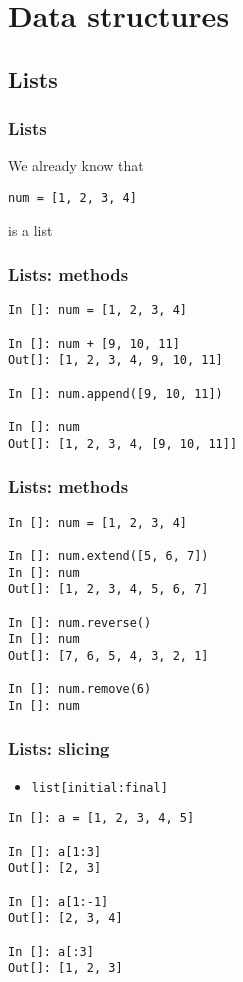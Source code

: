 \documentclass[14pt,compress]{beamer}
\newcommand{\typ}[1]{\lstinline{#1}}
\begin{document}
\section{Data structures}
\subsection{Lists}
\begin{frame}[fragile]
  \frametitle{Lists}
\begin{block}{We already know that}
  \begin{lstlisting}
num = [1, 2, 3, 4]
  \end{lstlisting}
\centerline{is a list}
\end{block}
\end{frame}

\begin{frame}[fragile]
  \frametitle{Lists: methods}
  \begin{lstlisting}
In []: num = [1, 2, 3, 4]

In []: num + [9, 10, 11]
Out[]: [1, 2, 3, 4, 9, 10, 11]

In []: num.append([9, 10, 11])

In []: num
Out[]: [1, 2, 3, 4, [9, 10, 11]]
  \end{lstlisting}
\end{frame}

\begin{frame}[fragile]
  \frametitle{Lists: methods}
  \begin{lstlisting}
In []: num = [1, 2, 3, 4]

In []: num.extend([5, 6, 7])
In []: num
Out[]: [1, 2, 3, 4, 5, 6, 7]

In []: num.reverse()
In []: num
Out[]: [7, 6, 5, 4, 3, 2, 1]

In []: num.remove(6)
In []: num
  \end{lstlisting}
\end{frame}

\begin{frame}[fragile]
  \frametitle{Lists: slicing}
  \begin{itemize}
    \item \typ{list[initial:final]}
  \end{itemize}
\begin{lstlisting}
In []: a = [1, 2, 3, 4, 5]

In []: a[1:3]
Out[]: [2, 3]

In []: a[1:-1]
Out[]: [2, 3, 4]

In []: a[:3]
Out[]: [1, 2, 3]
\end{lstlisting}
\end{frame}
\end{document}
